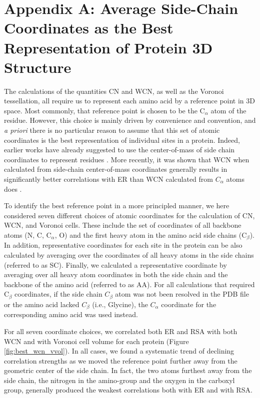 \documentclass[12pt]{article}
\begin{document}
\section*{Appendix A: Average Side-Chain Coordinates as the Best Representation of Protein 3D Structure}
\label{app:best_crd}

The calculations of the quantities CN and WCN, as well as the Voronoi tessellation, all require us to represent each amino acid by a reference point in 3D space. Most commonly, that reference point is chosen to be the C$_\alpha$ atom of the residue. However, this choice is mainly driven by convenience and convention, and \emph{a priori} there is no particular reason to assume that this set of atomic coordinates is the best representation of individual sites in a protein. Indeed, earlier works have already suggested to use the center-of-mass of side chain coordinates to represent residues \cite{soyer_voronoi_2000}. More recently, it was shown that WCN when calculated from side-chain center-of-mass coordinates generally results in significantly better correlations with ER than WCN calculated from $C_\alpha$ atoms does \cite{marcos_too_2015}.

To identify the best reference point in a more principled manner, we here considered seven different choices of atomic coordinates for the calculation of CN, WCN, and Voronoi cells. These include the set of coordinates of all backbone atoms (N, C, C$_\alpha$, O) and the first heavy atom in the amino acid side chains (C$_\beta$). In addition, representative coordinates for each site in the protein can be also calculated by averaging over the coordinates of all heavy atoms in the side chains (referred to as SC). Finally, we calculated a representative coordinate by averaging over all heavy atom coordinates in both the side chain and the backbone of the amino acid (referred to as AA). For all calculations that required C$_\beta$ coordinates, if the side chain $C_\beta$ atom was not been resolved in the PDB file or the amino acid lacked $C_\beta$ (i.e., Glycine), the $C_\alpha$ coordinate for the corresponding amino acid was used instead.

For all seven coordinate choices, we correlated both ER and RSA with both WCN and with Voronoi cell volume for each protein (Figure \ref{fig:best_wcn_vvol}). In all cases, we found a systematic trend of declining correlation strengths as we moved the reference point further away from the geometric center of the side chain. In fact, the two atoms furthest away from the side chain, the nitrogen in the amino-group and the oxygen in the carboxyl group, generally produced the weakest correlations both with ER and with RSA.
\end{document}
